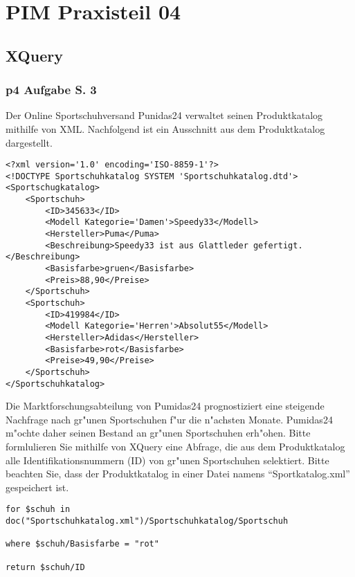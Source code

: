 

\chapter{PIM Praxisteil 04}

\section{XQuery}

\subsection{p4 Aufgabe S. 3}

Der Online Sportschuhversand Punidas24 verwaltet seinen Produktkatalog mithilfe von XML.
Nachfolgend ist ein Ausschnitt aus dem Produktkatalog dargestellt.\\

\lstset{style=customXML}
\begin{lstlisting}
<?xml version='1.0' encoding='ISO-8859-1'?>
<!DOCTYPE Sportschuhkatalog SYSTEM 'Sportschuhkatalog.dtd'>
<Sportschugkatalog>
    <Sportschuh>
        <ID>345633</ID>
        <Modell Kategorie='Damen'>Speedy33</Modell>
        <Hersteller>Puma</Puma>
        <Beschreibung>Speedy33 ist aus Glattleder gefertigt.</Beschreibung>
        <Basisfarbe>gruen</Basisfarbe>
        <Preis>88,90</Preise>
    </Sportschuh>
    <Sportschuh>
        <ID>419984</ID>
        <Modell Kategorie='Herren'>Absolut55</Modell>
        <Hersteller>Adidas</Hersteller>
        <Basisfarbe>rot</Basisfarbe>
        <Preise>49,90</Preise>
    </Sportschuh>
</Sportschuhkatalog>
\end{lstlisting}
\bigskip

\noindent
Die Marktforschungsabteilung von Pumidas24 prognostiziert eine steigende Nachfrage nach gr"unen Sportschuhen f"ur die n"achsten Monate.
Pumidas24 m"ochte daher seinen Bestand an gr"unen Sportschuhen erh"ohen.
Bitte formlulieren Sie mithilfe von XQuery eine Abfrage, die aus dem Produktkatalog alle Identifikationsnummern (ID) von gr"unen Sportschuhen selektiert.
Bitte beachten Sie, dass der Produktkatalog in einer Datei namens "`Sportkatalog.xml"' gespeichert ist.\\

\lstset{language=PHP}
\begin{lstlisting}
for $schuh in doc("Sportschuhkatalog.xml")/Sportschuhkatalog/Sportschuh

where $schuh/Basisfarbe = "rot"

return $schuh/ID
\end{lstlisting} %

